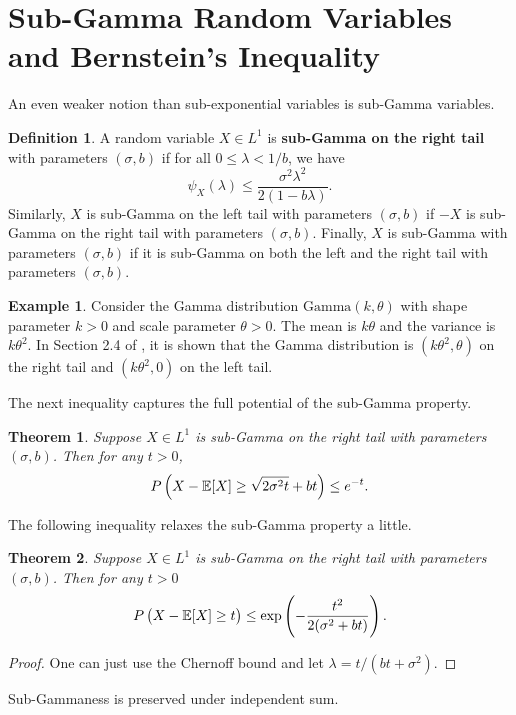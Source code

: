 \documentclass[openany]{book}
\newtheorem{theorem}{Theorem}[chapter]
\theoremstyle{definition}
\newtheorem{definition}{Definition}[chapter]
\newtheorem{example}{Example}[chapter]
\theoremstyle{remark}
\begin{document}
\section{Sub-Gamma Random Variables and Bernstein's Inequality}
An even weaker notion than sub-exponential variables is sub-Gamma variables.
\begin{definition}\label{Def:subGamma}
    A random variable $X\in L^1$ is \textbf{sub-Gamma on the right tail} with parameters $(\sigma,b)$ if for all $0\le\lambda<1/b$, we have
    \begin{equation*}
        \psi_X(\lambda)\le\frac{\sigma^2\lambda^2}{2(1-b\lambda)}.
    \end{equation*}
    Similarly, $X$ is sub-Gamma on the left tail with parameters $(\sigma,b)$ if $-X$ is sub-Gamma on the right tail with parameters $(\sigma,b)$. Finally, $X$ is sub-Gamma with parameters $(\sigma,b)$ if it is sub-Gamma on both the left and the right tail with parameters $(\sigma,b)$.
\end{definition}
\begin{example}
    Consider the Gamma distribution $\mathrm{Gamma}(k,\theta)$ with shape parameter $k>0$ and scale parameter $\theta>0$. The mean is $k\theta$ and the variance is $k\theta^2$. In Section 2.4 of \cite{BLM13}, it is shown that the Gamma distribution is $(k\theta^2,\theta)$ on the right tail and $(k\theta^2,0)$ on the left tail.
\end{example}
The next inequality captures the full potential of the sub-Gamma property.
\begin{theorem}
    Suppose $X\in L^1$ is sub-Gamma on the right tail with parameters $(\sigma,b)$. Then for any $t>0$,
    \begin{equation*}
        P\del{X-\mathbb{E}[X]\ge\sqrt{2\sigma^2t}+bt}\le e^{-t}.
    \end{equation*}
\end{theorem}
The following inequality relaxes the sub-Gamma property a little.
\begin{theorem}
    Suppose $X\in L^1$ is sub-Gamma on the right tail with parameters $(\sigma,b)$. Then for any $t>0$
    \begin{equation*}
        P\del{X-\mathbb{E}[X]\ge t}\le\exp\left(-\frac{t^2}{2(\sigma^2+bt)}\right).
    \end{equation*}
\end{theorem}
\begin{proof}
    One can just use the Chernoff bound and let $\lambda=t/(bt+\sigma^2)$.
\end{proof}
Sub-Gammaness is preserved under independent sum.
\end{document}
